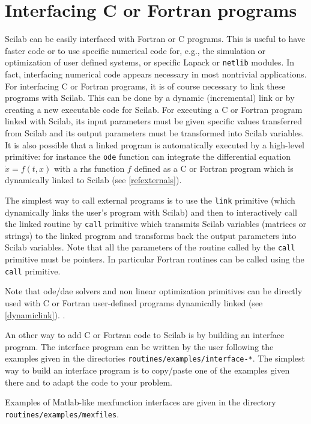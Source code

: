 \chapter{Interfacing C or Fortran programs}

Scilab can be easily interfaced with Fortran or C programs. 
This is useful to have faster code or to use specific numerical
code for, e.g., the simulation or optimization of
user defined systems, or specific Lapack or {\tt netlib} modules. 
In fact, interfacing numerical code appears necessary in most
nontrivial applications. For
interfacing C or Fortran programs, it is of course necessary to link
these programs with Scilab. This can be done by a dynamic
(incremental) link or by creating a new executable code for Scilab.
For executing a C or Fortran program linked with Scilab, its
input parameters must be given specific values transferred from Scilab
and its output
parameters must be transformed into Scilab variables.
It is also possible that a linked program is automatically executed
by a high-level primitive: for instance the {\tt ode} function
can integrate the differential equation $\dot{x} = f(t,x)$ with a
rhs function $f$ defined as a C or Fortran program which is
dynamically linked to Scilab (see \ref{refexternals}).


The simplest way to call external programs is to use the  
{\tt link} primitive
(which dynamically links the user's program with Scilab)
and then to interactively call
the linked routine by {\tt call} primitive
which transmits Scilab variables (matrices or strings) to the linked program
and transforms back the output parameters into Scilab variables. 
Note that all the parameters of the routine called by the {\tt call} 
primitive must be pointers. In particular Fortran routines can be called
using the {\tt call} primitive.

Note that ode/dae solvers and non linear optimization primitives
can be directly used with C or Fortran user-defined programs
dynamically linked (see \ref{dynamiclink}). . 

An other way to add C or Fortran code to Scilab is by 
building an interface program. The interface program can be written by
the user following the examples given in the directories
{\tt routines/examples/interface-*}. The simplest way to build an
interface program is to copy/paste one of the examples given there and to
adapt the code to your problem.

Examples of Matlab-like mexfunction interfaces are given in the 
directory {\tt routines/examples/mexfiles}.

